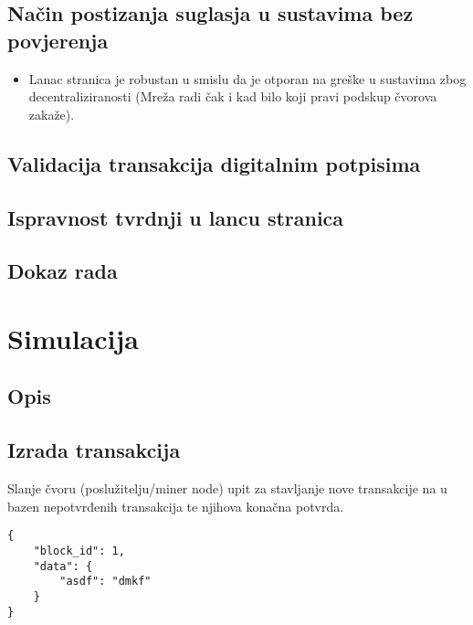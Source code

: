 \documentclass[utf8, zavrsni]{fer}
\begin{document}

\section{Način postizanja suglasja u sustavima bez povjerenja}
\begin{itemize}
	\item Lanac stranica je robustan u smislu da je otporan na greške u sustavima zbog decentraliziranosti (Mreža radi čak i kad bilo koji pravi podskup čvorova zakaže).
\end{itemize}





\section{Validacija transakcija digitalnim potpisima}

\section{Ispravnost tvrdnji u lancu stranica }

\section{Dokaz rada}


\chapter{Simulacija}

\section{Opis}
\section{Izrada transakcija}
Slanje čvoru (poslužitelju/miner node) upit za stavljanje nove transakcije na u bazen nepotvrđenih transakcija te njihova konačna potvrda.
\begin{verbatim}
{
	"block_id": 1,
	"data": {
		"asdf": "dmkf"
	}
}
\end{verbatim}
\end{document}
